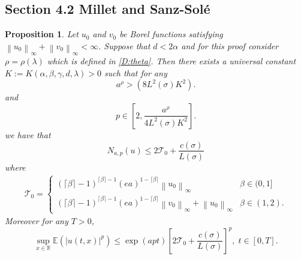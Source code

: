 \documentclass[a4paper,11pt]{article}
\numberwithin{equation}{section}
\theoremstyle{plain}
\newtheorem{proposition}[theorem]{Proposition}
\theoremstyle{definition}
\newcommand{\Norm}[1]{\left\|  #1   \right\|}
\newcommand{\R}{\mathbb{R}}
\numberwithin{NQ}{section}
\numberwithin{LQ}{section}
\numberwithin{ZQ}{section}
\begin{document}
	\subsection{Section 4.2 Millet and Sanz-Sol\'e \cite{SoleMillet2021}}
	
	\begin{proposition}{\normalfont\cite[Proposition 4.4]{SoleMillet2021}}
		Let $u_0$ and $v_0$ be Borel functions satisfying $\Norm{u_0}_\infty + \Norm{v_0}_\infty < \infty$. Suppose that $d < 2 \alpha$ and for this proof consider $\rho = \rho(\lambda)$ which is defined in \eqref{D:theta}. Then there exists a universal constant $K:=K(\alpha, \beta, \gamma,d, \lambda ) >0$ such that for any 
		\[
		a^\rho > \left( 8 L^2(\sigma)K^2\right).
		\]
		and 
		\[
		p \in \left[ 2, \frac{a^{\rho}}{4L^2(\sigma)K^2} \right].
		\]
		we have that 
		\begin{equation}
		\label{E:ColorNbdd}
		N_{a,p}(u)  \le 2 \mathcal{T}_0 +  \frac{c(\sigma)}{L(\sigma)}
		\end{equation}	
		where
		\begin{align*}
		\mathcal{T}_0 = \begin{cases} 
		(\lceil \beta \rceil - 1)^{\lceil \beta \rceil -1}(ea)^{1-\lceil \beta \rceil} \Norm{u_0}_\infty  & \beta \in (0,1]
		\\ (\lceil \beta \rceil - 1)^{\lceil \beta \rceil -1}(ea)^{1-\lceil \beta \rceil} \Norm{v_0}_\infty + \Norm{u_0}_\infty & \beta \in (1,2).
		\end{cases} 
		\end{align*}
		Moreover for any $T>0$,
		\begin{equation}
		\label{E:ColorPMomBdd}
		\sup_{x\in\R} \mathbb{E}(|u(t,x)|^p) \le \exp\left( a p t  \right) \left[ 2 \mathcal{T}_0 + \frac{ c(\sigma) }{L(\sigma)} \right]^p, \; t\in[0,T].
		\end{equation}
	\end{proposition}
	
\end{document}
